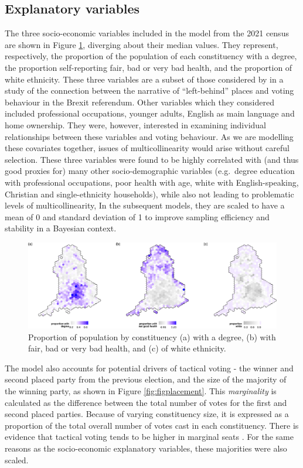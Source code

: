 \documentclass[webpdf,large,contemporary,namedate]{oup-authoring-template}
\theoremstyle{thmstyleone}
\theoremstyle{thmstyletwo}
\theoremstyle{thmstylethree}
\begin{document}
\subsection{Explanatory variables}\label{explanatory-variables}

The three socio-economic variables included in the model from the 2021
census are shown in Figure \ref{fig:figsocec}, diverging about their
median values. They represent, respectively, the proportion of the
population of each constituency with a degree, the proportion
self-reporting fair, bad or very bad health, and the proportion of white
ethnicity. These three variables are a subset of those considered by
\citet{beecham2018} in a study of the connection between the narrative
of ``left-behind'' places and voting behaviour in the Brexit referendum.
Other variables which they considered included professional occupations,
younger adults, English as main language and home ownership. They were,
however, interested in examining individual relationships between these
variables and voting behaviour. As we are modelling these covariates
together, issues of multicollinearity would arise without careful
selection. These three variables were found to be highly correlated with
(and thus good proxies for) many other socio-demographic variables
(e.g.~degree education with professional occupations, poor health with
age, white with English-speaking, Christian and single-ethnicity
households), while also not leading to problematic levels of
multicollinearity, In the subsequent models, they are scaled to have a
mean of 0 and standard deviation of 1 to improve sampling efficiency and
stability in a Bayesian context.

\begin{figure}[th]
\includegraphics[width=1\linewidth]{jrss_resubmission3_files/figure-latex/figsocec-1} \caption{Proportion of population by constituency (a) with a degree, (b) with fair, bad or very bad health, and (c) of white ethnicity.}\label{fig:figsocec}
\end{figure}

The model also accounts for potential drivers of tactical voting - the
winner and second placed party from the previous election, and the size
of the majority of the winning party, as shown in Figure
\ref{fig:figplacement}. This \emph{marginality} is calculated as the
difference between the total number of votes for the first and second
placed parties. Because of varying constituency size, it is expressed as
a proportion of the total overall number of votes cast in each
constituency. There is evidence that tactical voting tends to be higher
in marginal seats \citep{Cain1978tact, Johnston1992tact}. For the same
reasons as the socio-economic explanatory variables, these majorities
were also scaled.
\end{document}
